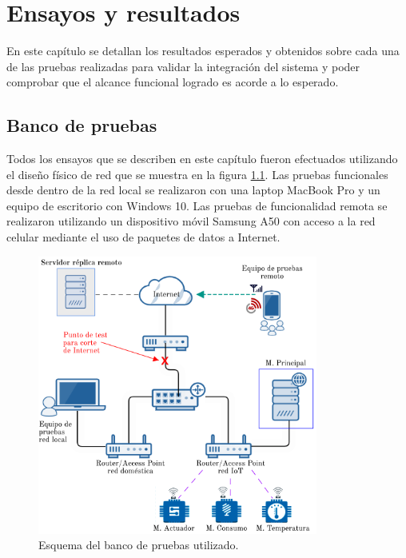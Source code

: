
\chapter{Ensayos y resultados} %

\label{Chapter4} %


En este capítulo se detallan los resultados esperados y obtenidos sobre cada una de las pruebas realizadas para validar la integración del sistema y poder comprobar que el alcance funcional logrado es acorde a lo esperado.


\section{Banco de pruebas}

Todos los ensayos que se describen en este capítulo fueron efectuados utilizando el diseño físico de red que se muestra en la figura \ref{fig:banco}. Las pruebas funcionales desde dentro de la red local se realizaron con una laptop MacBook Pro y un equipo de escritorio con Windows 10. Las pruebas de funcionalidad remota se realizaron utilizando un dispositivo móvil Samsung A50 con acceso a la red celular mediante el uso de paquetes de datos a Internet.

\begin{figure}[htbp]
	\centering
	\includegraphics[width=0.82\textwidth]{./Figures/banco2.png}
	\caption{Esquema del banco de pruebas utilizado.}

	\label{fig:banco}
\end{figure}


